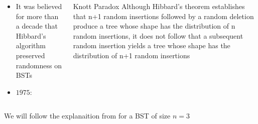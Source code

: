 \documentclass{beamer}
\begin{document}
\begin{frame}
    
\begin{columns}[c]
    \begin{column}{0.5\textwidth}
     \begin{itemize}
         \item It was believed for more than a decade that Hibbard's algorithm preserved randomness on BSTs
             \pause
         \item $1975$: \cite{knott1975deletion}
     \end{itemize}
    \end{column}
    \begin{column}{0.5\textwidth}
        \begin{center}
            \begin{block}{Knott Paradox}
                Although Hibbard’s theorem establishes that n+1 random insertions
                followed by a random deletion produce a tree whose shape has the distribution of n random insertions, it does not follow that a
                subsequent random insertion yields a tree whose shape has the distribution of n+1 random insertions
            \end{block}
        \end{center}
    \end{column}
    
\end{columns}
\end{frame}

\begin{frame}
    We will follow the explanaition from \cite{jonassen1978trivial} for a BST of size $n = 3$
\end{frame}
\end{document}
